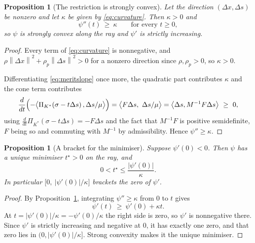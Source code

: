 \documentclass[a4paper,11pt]{book}
\theoremstyle{plain}
\newtheorem{proposition}[theorem]{Proposition}
\theoremstyle{definition}
\theoremstyle{remark}
\numberwithin{equation}{chapter}
\numberwithin{algorithm}{chapter}
\newcommand{\proj}[2]{\Pi_{#2}\!\left(#1\right)}
\newcommand{\norm}[1]{\left\|#1\right\|}
\newcommand{\inner}[2]{\left\langle #1, #2 \right\rangle}
\begin{document}
	\begin{proposition}[The restriction is strongly convex]\label{prop:meritconvex}
		Let the direction $(\Delta x,\Delta s)$ be nonzero and let $\kappa$ be given
		by \eqref{eq:curvature}. Then $\kappa>0$ and
		\begin{equation}
			\psi''(t)\ \geq\ \kappa
			\qquad\text{for every }t\geq0 ,
		\end{equation}
		so $\psi$ is strongly convex along the ray and $\psi'$ is strictly
		increasing.
	\end{proposition}

	\begin{proof}
		Every term of \eqref{eq:curvature} is nonnegative, and
		$\rho\norm{\Delta x}^2+\rho_p\norm{\Delta s}^2>0$ for a nonzero direction
		since $\rho,\rho_p>0$, so $\kappa>0$.

		Differentiating \eqref{eq:meritslope} once more, the quadratic part
		contributes $\kappa$ and the cone term contributes
		\[
		\frac{d}{dt}\Bigl(-\bigl\langle\proj{\sigma-t\Delta s}{K^*},
		\Delta s/\mu\bigr\rangle\Bigr)
		=\bigl\langle F\Delta s,\ \Delta s/\mu\bigr\rangle
		=\inner{\Delta s}{M^{-1}F\Delta s}\ \geq\ 0 ,
		\]
		using $\tfrac{d}{dt}\proj{\sigma-t\Delta s}{K^*}=-F\Delta s$ and the fact
		that $M^{-1}F$ is positive semidefinite, $F$ being so and commuting with
		$M^{-1}$ by admissibility. Hence $\psi''\geq\kappa$.
	\end{proof}

	\begin{proposition}[A bracket for the minimiser]\label{prop:bracket}
		Suppose $\psi'(0)<0$. Then $\psi$ has a unique minimiser $t^{\star}>0$ on
		the ray, and
		\begin{equation}
			0<t^{\star}\leq\frac{|\psi'(0)|}{\kappa} .
		\end{equation}
		In particular $\bigl[0,\ |\psi'(0)|/\kappa\bigr]$ brackets the zero of
		$\psi'$.
	\end{proposition}

	\begin{proof}
		By Proposition~\ref{prop:meritconvex}, integrating $\psi''\geq\kappa$ from
		$0$ to $t$ gives
		\[
		\psi'(t)\ \geq\ \psi'(0)+\kappa t .
		\]
		At $t=|\psi'(0)|/\kappa=-\psi'(0)/\kappa$ the right side is zero, so
		$\psi'$ is nonnegative there. Since $\psi'$ is strictly increasing and
		negative at $0$, it has exactly one zero, and that zero lies in
		$(0,|\psi'(0)|/\kappa]$. Strong convexity makes it the unique minimiser.
	\end{proof}
\end{document}
